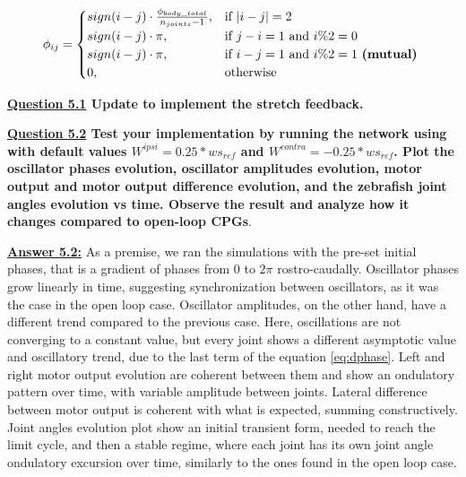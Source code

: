 \documentclass{cmc}
\begin{document}
\begin{equation}
  \label{eq:phicw}
  \phi_{ij} =
    \begin{cases}
    sign(i-j)\cdot\frac{\phi_{body\_total}}{n_{joints}-1},& \text{if } |i-j|=2 \\
    sign(i-j)\cdot\pi,&  \text{if }  j-i=1 \text{ and } i\%2=0\\
    sign(i-j)\cdot\pi,& \text{if }   i-j=1 \text{ and } i\%2=1 \text{ \textbf{(mutual)} }\\
    0, & \text{otherwise} \\
    \end{cases}
\end{equation}

\textbf{\underline{Question 5.1} Update  to implement the stretch feedback.}

\textbf{\underline{Question 5.2} Test your implementation by running the network using  with default values $W^{ipsi}=0.25 * ws_{ref}$ and $W^{contra}=-0.25 * ws_{ref}$. Plot the oscillator phases evolution, oscillator amplitudes evolution, motor output and motor output difference evolution, and the zebrafish joint angles evolution vs time. Observe the result and analyze how it changes compared to open-loop CPGs}.

\textbf{\underline{Answer 5.2:}} 
As a premise, we ran the simulations with the pre-set initial phases, that is a gradient of phases from 0 to $2\pi$ rostro-caudally.
Oscillator phases grow linearly in time, suggesting synchronization between oscillators, as it was the case in the open loop case. Oscillator amplitudes, on the other hand, have a different trend compared to the previous case. Here, oscillations are not converging to a constant value, but every joint shows a different asymptotic value and oscillatory trend, due to the last term of the equation \ref{eq:dphase}. Left and right motor output evolution are coherent between them and show an ondulatory pattern over time, with  variable amplitude between joints. Lateral difference between motor output is coherent with what is expected, summing constructively. Joint angles evolution plot show an initial transient form, needed to reach the limit cycle, and then a stable regime, where each joint has its own joint angle ondulatory excursion over time, similarly to the ones found in the open loop case.
\end{document}
